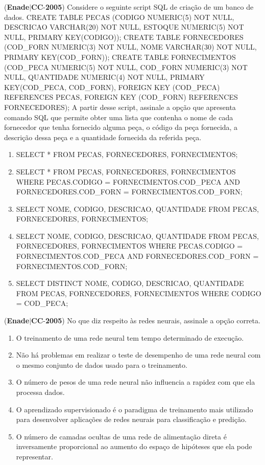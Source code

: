 \documentclass{exam}
\begin{document}
\begin{questions}
\begin{enumerate}[label=\alph*)]
	\end{enumerate}

\question (\textbf{Enade}$|$\textbf{CC}-\textbf{2005}) Considere o seguinte script SQL de criação de um banco de
dados.
CREATE TABLE PECAS (CODIGO NUMERIC(5) NOT NULL,
DESCRICAO VARCHAR(20) NOT NULL,
ESTOQUE NUMERIC(5) NOT NULL,
PRIMARY KEY(CODIGO));
CREATE TABLE FORNECEDORES
(COD\_FORN NUMERIC(3) NOT NULL,
NOME VARCHAR(30) NOT NULL,
PRIMARY KEY(COD\_FORN));
CREATE TABLE FORNECIMENTOS
(COD\_PECA NUMERIC(5) NOT NULL,
COD\_FORN NUMERIC(3) NOT NULL,
QUANTIDADE NUMERIC(4) NOT NULL,
PRIMARY KEY(COD\_PECA, COD\_FORN),
FOREIGN KEY (COD\_PECA) REFERENCES PECAS,
FOREIGN KEY (COD\_FORN) REFERENCES
FORNECEDORES);
A partir desse script, assinale a opção que apresenta comando
SQL que permite obter uma lista que contenha o nome de cada
fornecedor que tenha fornecido alguma peça, o código da peça
fornecida, a descrição dessa peça e a quantidade fornecida da
referida peça.
	\begin{enumerate}[label=\alph*)]
		\item  SELECT * FROM PECAS, FORNECEDORES,
FORNECIMENTOS;
		\item  SELECT * FROM PECAS, FORNECEDORES,
FORNECIMENTOS WHERE PECAS.CODIGO =
FORNECIMENTOS.COD\_PECA AND
FORNECEDORES.COD\_FORN =
FORNECIMENTOS.COD\_FORN;
		\item  SELECT NOME, CODIGO, DESCRICAO, QUANTIDADE
FROM PECAS, FORNECEDORES, FORNECIMENTOS;
		\item  SELECT NOME, CODIGO, DESCRICAO, QUANTIDADE
FROM PECAS, FORNECEDORES, FORNECIMENTOS
WHERE PECAS.CODIGO = FORNECIMENTOS.COD\_PECA
AND FORNECEDORES.COD\_FORN =
FORNECIMENTOS.COD\_FORN;
		\item  SELECT DISTINCT NOME, CODIGO, DESCRICAO,
QUANTIDADE
FROM PECAS, FORNECEDORES, FORNECIMENTOS
WHERE CODIGO = COD\_PECA;

	\end{enumerate}

\question (\textbf{Enade}$|$\textbf{CC}-\textbf{2005}) No que diz respeito às redes neurais, assinale a opção correta.
	\begin{enumerate}[label=\alph*)]
		\item  O treinamento de uma rede neural tem tempo determinado de
execução.
		\item  Não há problemas em realizar o teste de desempenho de uma
rede neural com o mesmo conjunto de dados usado para o
treinamento.
		\item  O número de pesos de uma rede neural não influencia a
rapidez com que ela processa dados.
		\item  O aprendizado supervisionado é o paradigma de treinamento
mais utilizado para desenvolver aplicações de redes neurais
para classificação e predição.
		\item  O número de camadas ocultas de uma rede de alimentação
direta é inversamente proporcional ao aumento do espaço de
hipóteses que ela pode representar.


\end{enumerate}
\end{questions}
\end{document}

